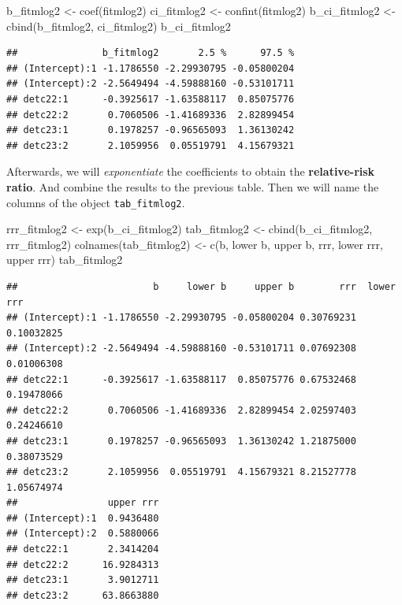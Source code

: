 \documentclass[
  10pt,
]{krantz}
\newenvironment{Shaded}{\begin{snugshade}}{\end{snugshade}}
\newcommand{\FunctionTok}[1]{\textcolor[rgb]{0.00,0.00,0.00}{#1}}
\newcommand{\NormalTok}[1]{#1}
\newcommand{\OtherTok}[1]{\textcolor[rgb]{0.56,0.35,0.01}{#1}}
\newcommand{\StringTok}[1]{\textcolor[rgb]{0.31,0.60,0.02}{#1}}
\begin{document}
\begin{Shaded}
\begin{Highlighting}[]
\NormalTok{b\_fitmlog2 }\OtherTok{\textless{}{-}} \FunctionTok{coef}\NormalTok{(fitmlog2)}
\NormalTok{ci\_fitmlog2 }\OtherTok{\textless{}{-}} \FunctionTok{confint}\NormalTok{(fitmlog2)}
\NormalTok{b\_ci\_fitmlog2 }\OtherTok{\textless{}{-}} \FunctionTok{cbind}\NormalTok{(b\_fitmlog2, ci\_fitmlog2)}
\NormalTok{b\_ci\_fitmlog2}
\end{Highlighting}
\end{Shaded}

\begin{verbatim}
##               b_fitmlog2       2.5 %      97.5 %
## (Intercept):1 -1.1786550 -2.29930795 -0.05800204
## (Intercept):2 -2.5649494 -4.59888160 -0.53101711
## detc22:1      -0.3925617 -1.63588117  0.85075776
## detc22:2       0.7060506 -1.41689336  2.82899454
## detc23:1       0.1978257 -0.96565093  1.36130242
## detc23:2       2.1059956  0.05519791  4.15679321
\end{verbatim}

Afterwards, we will \emph{exponentiate} the coefficients to obtain the \textbf{relative-risk ratio}. And combine the results to the previous table. Then we will name the columns of the object \texttt{tab\_fitmlog2}.

\begin{Shaded}
\begin{Highlighting}[]
\NormalTok{rrr\_fitmlog2 }\OtherTok{\textless{}{-}} \FunctionTok{exp}\NormalTok{(b\_ci\_fitmlog2)}
\NormalTok{tab\_fitmlog2 }\OtherTok{\textless{}{-}} \FunctionTok{cbind}\NormalTok{(b\_ci\_fitmlog2, rrr\_fitmlog2)}
\FunctionTok{colnames}\NormalTok{(tab\_fitmlog2) }\OtherTok{\textless{}{-}} \FunctionTok{c}\NormalTok{(}\StringTok{\textquotesingle{}b\textquotesingle{}}\NormalTok{, }\StringTok{\textquotesingle{}lower b\textquotesingle{}}\NormalTok{, }\StringTok{\textquotesingle{}upper b\textquotesingle{}}\NormalTok{, }
                            \StringTok{\textquotesingle{}rrr\textquotesingle{}}\NormalTok{, }\StringTok{\textquotesingle{}lower rrr\textquotesingle{}}\NormalTok{, }\StringTok{\textquotesingle{}upper rrr\textquotesingle{}}\NormalTok{)}
\NormalTok{tab\_fitmlog2}
\end{Highlighting}
\end{Shaded}

\begin{verbatim}
##                        b     lower b     upper b        rrr  lower rrr
## (Intercept):1 -1.1786550 -2.29930795 -0.05800204 0.30769231 0.10032825
## (Intercept):2 -2.5649494 -4.59888160 -0.53101711 0.07692308 0.01006308
## detc22:1      -0.3925617 -1.63588117  0.85075776 0.67532468 0.19478066
## detc22:2       0.7060506 -1.41689336  2.82899454 2.02597403 0.24246610
## detc23:1       0.1978257 -0.96565093  1.36130242 1.21875000 0.38073529
## detc23:2       2.1059956  0.05519791  4.15679321 8.21527778 1.05674974
##                upper rrr
## (Intercept):1  0.9436480
## (Intercept):2  0.5880066
## detc22:1       2.3414204
## detc22:2      16.9284313
## detc23:1       3.9012711
## detc23:2      63.8663880
\end{verbatim}
\end{document}
